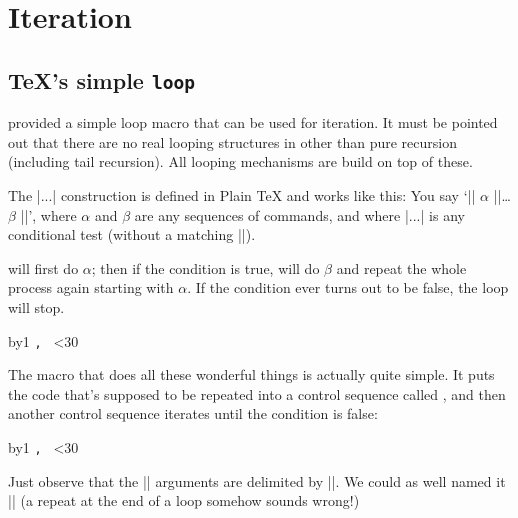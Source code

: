 \chapter{Iteration}
\section*{\TeX's simple \protect\texttt{loop}}

 provided a simple loop macro that can be used for iteration. It must be pointed out that there are no real looping structures in \tex other than pure recursion (including tail recursion). All looping mechanisms are build on top of these.
\medskip
{}
\medskip

The |\loop...\repeat| construction is defined in Plain TeX and works like this:
You say `|\loop| $\alpha$ |\if|\dots $\beta$  |\repeat|', where $\alpha$ and $\beta$ are any sequences of
commands, and where |\if...| is any conditional test (without a matching |\fi|). 

\tex
will first do $\alpha$; then if the condition is true, \tex will do $\beta$ and repeat the whole process
again starting with $\alpha$. If the condition ever turns out to be false, the loop will stop.

{\noindent
\newcount\n
{}
\loop%
  \advance\n by1
  \texttt{\number\n, }%
  \ifnum\n<30%
\repeat%
}


The  macro that does all these wonderful things is actually quite simple.
It puts the code that's supposed to be repeated into a control sequence called
, and then another control sequence iterates until the condition is false:

\begin{teX}
\def\loop#1\repeat{\def\body{#1}\iterate}
\def\iterate{\body\let\next=\iterate\else\let\next=\relax\fi\next}
\end{teX}


\noindent\colorbox{gray!10}{\parbox{10cm}{\noindent
\newcount\n
{}
\loop
   \advance\n by1
     \texttt{\number\n, } 
   \ifnum\n<30
\repeat
}}
\bigskip

Just observe that the |\loop| arguments are delimited by |\repeat|. We could as well named it |\endloop| (a repeat at the end of a loop somehow sounds wrong!)

